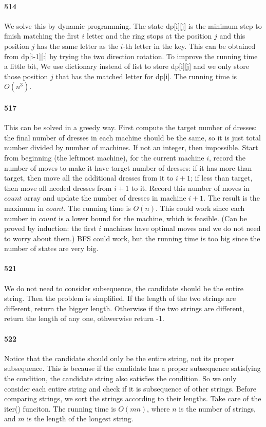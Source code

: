 \documentclass[11pt]{article}
\begin{document}
\paragraph{514}
We solve this by dynamic programming.
The state dp[i][j] is the minimum step to finish matching the first $i$ letter and the ring stops at the position $j$ and 
this position $j$ has the same letter as the $i$-th letter in the key. This can be obtained from dp[i-1][:] by trying the 
two direction rotation. To improve the running time a little bit, We use dictionary instead of list to store dp[i][j] and
we only store those position $j$ that has the matched letter for dp[i].
The running time is $O(n^3)$.

\paragraph{517}
This can be solved in a greedy way. 
First compute the target number of dresses: the final number of dresses in each machine should be the same, so it is just total number divided by number of machines. If not an integer, then impossible.
Start from beginning (the leftmost machine), for the current machine $i$, record the number of moves to make it have target number of dresses: if it has more than target, then move all the additional dresses from it to $i+1$; if less than target, then move all needed dresses from $i+1$ to it. 
Record this number of moves in $count$ array and update the number of dresses in machine $i+1$.
The result is the maximum in $count$.
The running time is $O(n)$.
This could work since each number in $count$ is a lower bound for the machine, which is feasible. (Can be proved by induction: the first $i$ machines have optimal moves and we do not need to worry about them.)
BFS could work, but the running time is too big since the number of states are very big.

\paragraph{521}
We do not need to consider subsequence, the candidate should be the entire string. Then the problem is simplified. If the length of the two strings are different, return the bigger length. Otherwise if the two strings are different, return 
the length of any one, othwerwise return -1. 

\paragraph{522}
Notice that the candidate should only be the entire string, not its proper subsequence.
This is because if the candidate has a proper subsequence satisfying the condition, the candidate string also satisfies the 
condition. So we only consider each entire string and check if it is subsequence of other strings. 
Before comparing strings, we sort the strings according to their lengths. Take care of the iter() funciton. 
The running time is $O(mn)$, where $n$ is the number of strings, and $m$ is the length of the longest string.
\end{document}
